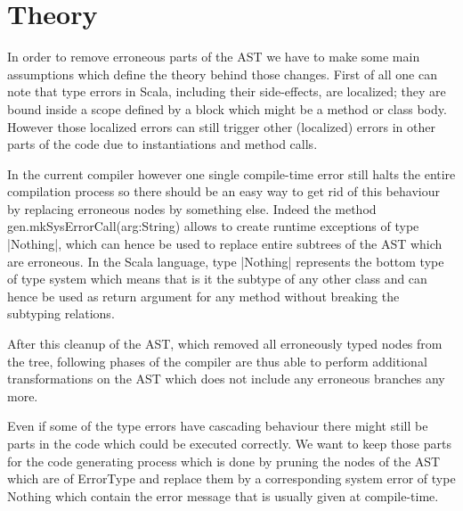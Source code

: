 \section{Theory}


In order to remove erroneous parts of the AST we have to make some main assumptions which define the theory behind those changes.
First of all one can note that type errors in Scala, including their side-effects, are localized; they are bound inside a scope defined by a block which might be a method or class body. However those localized errors can still trigger other (localized) errors in other parts of the code due to instantiations and method calls.

In the current compiler however one single compile-time error still halts the entire compilation process so there should be an easy way to get rid of this behaviour by replacing erroneous nodes by something else. Indeed the method gen.mkSysErrorCall(arg:String) allows to create runtime exceptions of type |Nothing|, which can hence be used to replace entire subtrees of the AST which are erroneous. In the Scala language, type |Nothing| represents the bottom type of type system which means that is it the subtype of any other class and can hence be used as return argument for any method without breaking the subtyping relations.

After this cleanup of the AST, which removed all erroneously typed nodes from the tree, following phases of the compiler are thus able to perform additional transformations on the AST which does not include any erroneous branches any more.

Even if some of the type errors have cascading behaviour there might still be parts in the code which could be executed correctly. We want to keep those parts for the code generating process which is done by pruning the nodes of the AST which are of ErrorType and replace them by a corresponding system error of type Nothing which contain the error message that is usually given at compile-time.